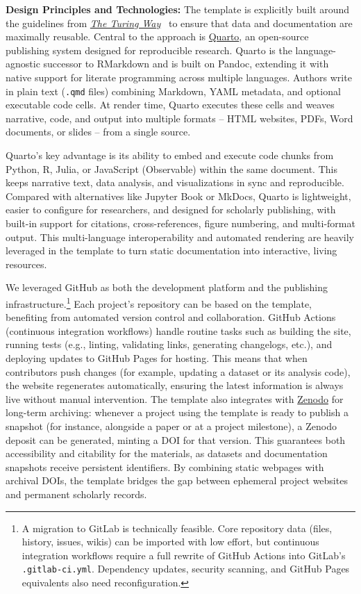 \documentclass{anthology-ch}         %
\begin{document}
\textbf{Design Principles and Technologies:} The template is explicitly built around the guidelines from \href{https://book.the-turing-way.org/}{\emph{The Turing Way}}~\cite{theturingwaycommunity2025} to ensure that data and documentation are maximally reusable. Central to the approach is \href{https://quarto.org/}{Quarto}, an open-source publishing system designed for reproducible research. Quarto is the language-agnostic successor to RMarkdown and is built on Pandoc, extending it with native support for literate programming across multiple languages. Authors write in plain text (\texttt{.qmd} files) combining Markdown, YAML metadata, and optional executable code cells. At render time, Quarto executes these cells and weaves narrative, code, and output into multiple formats -- HTML websites, PDFs, Word documents, or slides -- from a single source.

Quarto's key advantage is its ability to embed and execute code chunks from Python, R, Julia, or JavaScript (Observable) within the same document. This keeps narrative text, data analysis, and visualizations in sync and reproducible. Compared with alternatives like Jupyter Book or MkDocs, Quarto is lightweight, easier to configure for researchers, and designed for scholarly publishing, with built-in support for citations, cross-references, figure numbering, and multi-format output. This multi-language interoperability and automated rendering are heavily leveraged in the template to turn static documentation into interactive, living resources.

We leveraged GitHub as both the development platform and the publishing infrastructure.\footnote{A migration to GitLab is technically feasible. Core repository data (files, history, issues, wikis) can be imported with low effort, but continuous integration workflows require a full rewrite of GitHub Actions into GitLab's \texttt{.gitlab-ci.yml}. Dependency updates, security scanning, and GitHub Pages equivalents also need reconfiguration.} Each project's repository can be based on the template, benefiting from automated version control and collaboration. GitHub Actions (continuous integration workflows) handle routine tasks such as building the site, running tests (e.g., linting, validating links, generating changelogs, etc.), and deploying updates to GitHub Pages for hosting. This means that when contributors push changes (for example, updating a dataset or its analysis code), the website regenerates automatically, ensuring the latest information is always live without manual intervention. The template also integrates with \href{https://zenodo.org/}{Zenodo} for long-term archiving: whenever a project using the template is ready to publish a snapshot (for instance, alongside a paper or at a project milestone), a Zenodo deposit can be generated, minting a DOI for that version. This guarantees both accessibility and citability for the materials, as datasets and documentation snapshots receive persistent identifiers. By combining static webpages with archival DOIs, the template bridges the gap between ephemeral project websites and permanent scholarly records.
\end{document}
